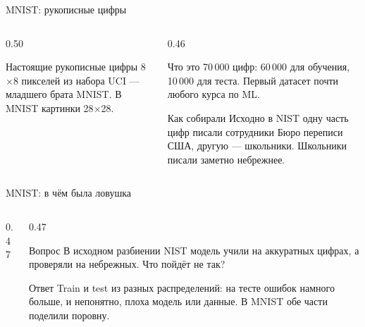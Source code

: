 \begin{frame}[c]{MNIST: рукописные цифры}
  \begin{columns}[T]
    \begin{column}{0.50\textwidth}
      \centering
      

      \smallskip
      {\footnotesize\color{acGray}Настоящие рукописные цифры 8$\times$8 пикселей из набора UCI ---
      младшего брата MNIST. В MNIST картинки 28$\times$28.\par}
    \end{column}
    \begin{column}{0.46\textwidth}
      \begin{block}{Что это}
        \small
        70\,000 цифр: 60\,000 для обучения, 10\,000 для теста. Первый датасет почти
        любого курса по ML.
      \end{block}
      \begin{block}{Как собирали}
        \small
        Исходно в NIST одну часть цифр писали сотрудники Бюро переписи США,
        другую --- школьники. Школьники писали заметно небрежнее.
      \end{block}
    \end{column}
  \end{columns}
\end{frame}

\begin{frame}[c]{MNIST: в чём была ловушка}
  \begin{columns}[T]
    \begin{column}{0.47\textwidth}
      \centering
    \end{column}
    \begin{column}{0.47\textwidth}
      \begin{block}{Вопрос}
        \small
        В исходном разбиении NIST модель учили на аккуратных цифрах, а проверяли
        на небрежных. Что пойдёт не так?
      \end{block}
      \pause
      \begin{block}{Ответ}
        \small
        Train и test из разных распределений: на тесте ошибок намного больше,
        и непонятно, плоха модель или данные. В MNIST обе части поделили поровну.
      \end{block}
    \end{column}
  \end{columns}
\end{frame}

